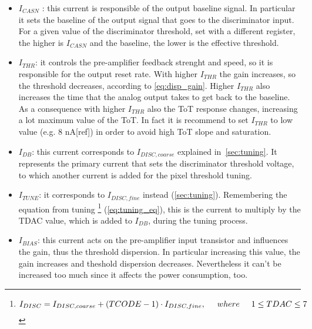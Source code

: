 \begin{itemize}
\label{currents}
\item \textit{$I_{CASN}$} : this current is responsible of the output baseline signal. In particular it sets the baseline of the output signal that goes to the discriminator input. For a given value of the discriminator threshold, set with a different register, the higher is \textit{$I_{CASN}$} and the baseline, the lower is the effective threshold. 
\item \textit{$I_{THR}$}: it controls the pre-amplifier feedback strenght and speed, so it is responsible for the output reset rate. With higher $I_{THR}$ the gain increases, so the threshold decreases, according to \autoref{eq:disp_gain}. Higher $I_{THR}$ also increases the time that the analog output takes to get back to the baseline. As a consequence with higher \textit{$I_{THR}$} also the ToT response changes, increasing a lot maximum value of the ToT. In fact it is recommend to set $I_{THR}$ to low value (e.g. 8 nA[ref]) in order to avoid high ToT slope and saturation.
\item \textit{$I_{DB}$}: this current corresponds to \textbf{$I_{DISC,coarse}$} explained in~\autoref{sec:tuning}. It represents the primary current that sets the discriminator threshold voltage, to which another current is added for the pixel threshold tuning.
\item \textit{$I_{TUNE}$}: it corresponds to \textbf{$I_{DISC,fine}$} instead (\autoref{sec:tuning}). Remembering the equation from tuning \footnote{
\begin{equation}
I_{DISC} = I_{DISC, coarse} + (TCODE - 1) \cdot I_{DISC,fine},  \hspace{.5cm}	where \hspace{.5cm} 1 \leq TDAC \leq 7
\end{equation}
} (\autoref{eq:tuning_eq}), this is the current to multiply by the TDAC value, which is added to $I_{DB}$, during the tuning process.
\item \textit{$I_{BIAS}$}: this current acts on the pre-amplifier input transistor and influences the gain, thus the threshold dispersion. In particular increasing this value, the gain increases and theshold dispersion decreases. Nevertheless it can't be increased too much since it affects the power consumption, too. %
\end{itemize}

